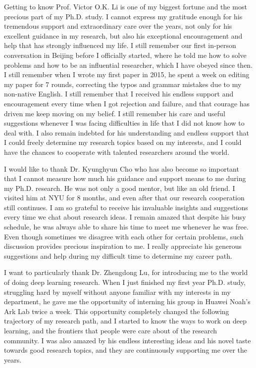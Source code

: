 
Getting to know Prof. Victor O.K. Li is one of my biggest fortune and the most precious part of my Ph.D. study. 
I cannot express my gratitude enough for his tremendous support and extraordinary care over the years, not only for his excellent guidance in my research, but also his exceptional encouragement and help that has strongly influenced my life. 
I still remember our first in-person conversation in Beijing before I officially started, where he told me how to solve problems and how to be an influential researcher, which I have obeyed since then.
I still remember when I wrote my first paper in 2015, he spent a week on editing my paper for 7 rounds, correcting the typos and grammar mistakes due to my non-native English. 
I still remember that I received his endless support and encouragement every time when I got rejection and failure, and that courage has driven me keep moving on my belief. 
I still remember his care and useful suggestions whenever I was facing difficulties in life that I did not know how to deal with.
I also remain indebted for his understanding and endless support that I could freely determine my research topics based on my interests, and I could have the chances to cooperate with talented researchers around the world.  



 I would like to thank Dr. Kyunghyun Cho who has also become so important that I cannot measure how much his guidance and support means to me during my Ph.D. research.  He was not only a good mentor, but like an old friend. I visited him at NYU for 8 months, and even after that our research cooperation still continues. I am so grateful to receive his invaluable insights and suggestions every time we chat about research ideas. 
 I remain amazed that despite his busy schedule, he was always able to share his time to meet me whenever he was free.
 Even though sometimes we disagree with each other for certain problems, such discussion provides precious inspiration to me. 
I really appreciate his generous suggestions and help during my difficult time to determine my career path.
 

 I want to particularly thank Dr. Zhengdong Lu, for introducing me to the world of doing deep learning research. 
 When I just finished my first year Ph.D. study, 
 struggling hard by myself without anyone familiar with my interests in my department, 
 he gave me the opportunity of interning his group in Huawei Noah's Ark Lab twice a week. 
 This opportunity completely changed the following trajectory of my research path, 
 and I started to know the ways to work on deep learning, 
 and the frontiers that people were care about of the research community.
 I was also amazed by his endless interesting ideas and his novel taste towards good research topics, 
and they are continuously supporting me over the years.

